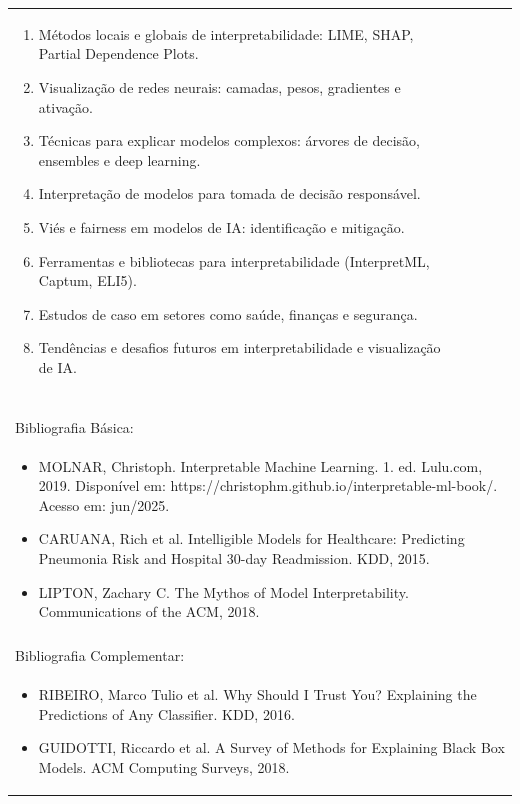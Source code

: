 \documentclass[11pt]{article}
\begin{document}
\begin{center}
\begin{longtable}{|p{4cm}|p{4cm}|p{4cm}|p{4cm}|}
{\begin{enumerate}
\item Métodos locais e globais de interpretabilidade: LIME, SHAP, Partial Dependence Plots.
\item Visualização de redes neurais: camadas, pesos, gradientes e ativação.
\item Técnicas para explicar modelos complexos: árvores de decisão, ensembles e deep learning.
\item Interpretação de modelos para tomada de decisão responsável.
\item Viés e fairness em modelos de IA: identificação e mitigação.
\item Ferramentas e bibliotecas para interpretabilidade (InterpretML, Captum, ELI5).
\item Estudos de caso em setores como saúde, finanças e segurança.
\item Tendências e desafios futuros em interpretabilidade e visualização de IA.\end{enumerate}}\\
\multicolumn{4}{|p{16cm}|}{}\\
\multicolumn{4}{|p{16cm}|}{}\\
\multicolumn{4}{|p{16cm}|}{\vspace{-1cm}}\\
\multicolumn{4}{|p{16cm}|}{}\\
\hline
\multicolumn{4}{|p{16cm}|}{Bibliografia Básica:}\\
\multicolumn{4}{|p{16cm}|}{%
\begin{itemize}\item MOLNAR, Christoph. Interpretable Machine Learning. 1. ed. Lulu.com, 2019. Disponível em: https://christophm.github.io/interpretable-ml-book/. Acesso em: jun/2025.
\item CARUANA, Rich et al. Intelligible Models for Healthcare: Predicting Pneumonia Risk and Hospital 30-day Readmission. KDD, 2015.
\item LIPTON, Zachary C. The Mythos of Model Interpretability. Communications of the ACM, 2018.\end{itemize}}\\
\multicolumn{4}{|p{16cm}|}{}\\
\hline
\multicolumn{4}{|p{16cm}|}{Bibliografia Complementar:}\\
\multicolumn{4}{|p{16cm}|}{%
\begin{itemize}\item RIBEIRO, Marco Tulio et al. Why Should I Trust You? Explaining the Predictions of Any Classifier. KDD, 2016.
\item GUIDOTTI, Riccardo et al. A Survey of Methods for Explaining Black Box Models. ACM Computing Surveys, 2018.

\end{itemize}}
\end{longtable}
\end{center}
\end{document}
